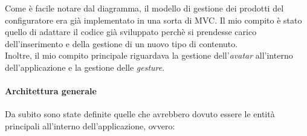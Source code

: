 Come \`e facile notare dal diagramma, il modello di gestione dei prodotti del configuratore era gi\`a implementato in una sorta di MVC. Il mio compito \`e stato quello di adattare il codice gi\`a sviluppato perch\`e si prendesse carico dell'inserimento e della gestione di un nuovo tipo di contenuto. \\
Inoltre, il mio compito principale riguardava la gestione dell'\textit{avatar\gloss} all'interno dell'applicazione e la gestione delle \textit{gesture}.

\paragraph{Architettura generale}
Da subito sono state definite quelle che avrebbero dovuto essere le entit\`a principali all'interno dell'applicazione, ovvero:

